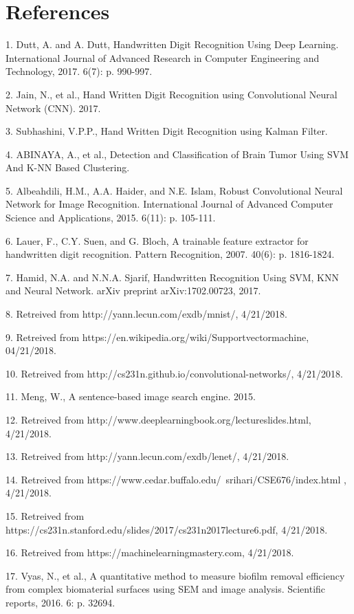 \documentclass{article}
\begin{document}
\section*{References}


%

1. Dutt, A. and A. Dutt, Handwritten Digit Recognition Using Deep Learning. International Journal of Advanced Research in Computer Engineering and Technology, 2017. 6(7): p. 990-997.

2.	Jain, N., et al., Hand Written Digit Recognition using Convolutional Neural Network (CNN). 2017.

3.	Subhashini, V.P.P., Hand Written Digit Recognition using Kalman Filter.

4.	ABINAYA, A., et al., Detection and Classification of Brain Tumor Using SVM And K-NN Based Clustering.

5.	Albeahdili, H.M., A.A. Haider, and N.E. Islam, Robust Convolutional Neural Network for Image Recognition. International Journal of Advanced Computer Science and Applications, 2015. 6(11): p. 105-111.

6.	Lauer, F., C.Y. Suen, and G. Bloch, A trainable feature extractor for handwritten digit recognition. Pattern Recognition, 2007. 40(6): p. 1816-1824.

7.	Hamid, N.A. and N.N.A. Sjarif, Handwritten Recognition Using SVM, KNN and Neural Network. arXiv preprint arXiv:1702.00723, 2017.

8.	Retreived from http://yann.lecun.com/exdb/mnist/, 4/21/2018.

9.	Retreived from https://en.wikipedia.org/wiki/Supportvectormachine, 04/21/2018.

10.	Retreived from http://cs231n.github.io/convolutional-networks/,  4/21/2018.

11.	Meng, W., A sentence-based image search engine. 2015.

12.	Retreived from http://www.deeplearningbook.org/lectureslides.html,  4/21/2018.

13.	Retreived from http://yann.lecun.com/exdb/lenet/,  4/21/2018.

14.	Retreived from https://www.cedar.buffalo.edu/~srihari/CSE676/index.html , 4/21/2018.

15.	Retreived from https://cs231n.stanford.edu/slides/2017/cs231n2017lecture6.pdf,  4/21/2018.

16.	Retreived from https://machinelearningmastery.com,  4/21/2018.

17.	Vyas, N., et al., A quantitative method to measure biofilm removal efficiency from complex biomaterial surfaces using SEM and image analysis. Scientific reports, 2016. 6: p. 32694.

  
\end{document}
